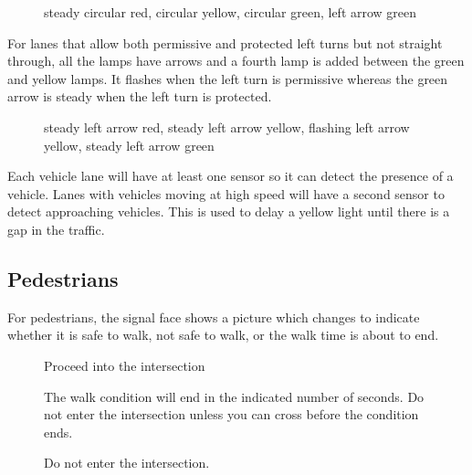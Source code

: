 \documentclass[letterpaper,twoside]{article}
\begin{document}
\begin{figure}[H]
           {\caption{steady circular red, circular yellow, circular green,
               left arrow green}\label{fig:four_A}}
\end{figure}

For lanes that allow both permissive and protected left turns but not
straight through, all the lamps have arrows and
a fourth lamp is added between the green and yellow lamps.  It flashes
when the left turn is permissive whereas the green arrow is steady
when the left turn is protected.

\begin{figure}[H]
           {\caption{steady left arrow red, steady left arrow yellow, flashing
               left arrow yellow, steady left arrow green}\label{four_B}}
\end{figure}

Each vehicle lane will have at least one sensor so it can detect the
presence of a vehicle.  Lanes with vehicles moving at high speed will
have a second sensor to detect approaching vehicles.  This is used to
delay a yellow light until there is a gap in the traffic.

\subsection{Pedestrians}
For pedestrians, the signal face shows a picture which changes to indicate
whether it is safe to walk, not safe to walk, or the walk time is about to end.

\begin{figure}[H]
  \fcapside
           {}
           {\caption{Proceed into the intersection}}
\end{figure}

\begin{figure}[H]
  \fcapside
           {}
           {\caption{The walk condition will end in the indicated
               number of seconds.  Do not enter the intersection
               unless you can cross before the condition ends.}}
\end{figure}

\begin{figure}[H]
  \fcapside
           {}
           {\caption{Do not enter the intersection.}}
\end{figure}
\end{document}

